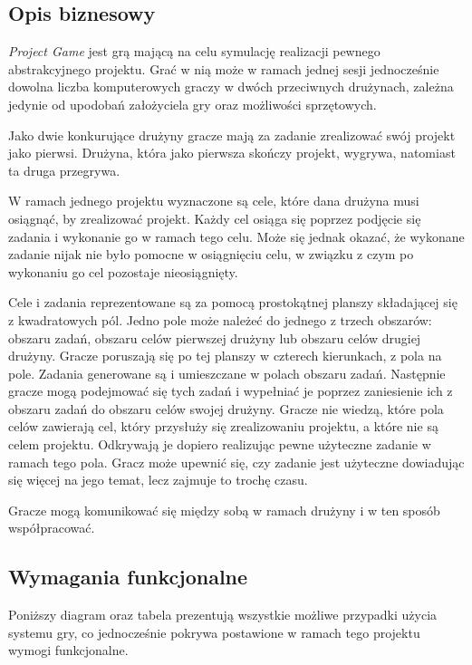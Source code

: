 \documentclass[11pt]{article}
\let\Oldsubsection\subsection
\renewcommand{\subsection}{\FloatBarrier\Oldsubsection}
\begin{document}
\subsection{Opis biznesowy}
\par
\textit{Project Game} jest grą mającą na celu symulację realizacji pewnego abstrakcyjnego projektu. Grać w nią może w ramach jednej sesji jednocześnie dowolna liczba komputerowych graczy w dwóch przeciwnych drużynach, zależna jedynie od upodobań założyciela gry oraz możliwości sprzętowych.
\par
Jako dwie konkurujące drużyny gracze mają za zadanie zrealizować swój projekt jako pierwsi. Drużyna, która jako pierwsza skończy projekt, wygrywa, natomiast ta druga przegrywa.
\par
W ramach jednego projektu wyznaczone są cele, które dana drużyna musi osiągnąć, by zrealizować projekt. Każdy cel osiąga się poprzez podjęcie się zadania i wykonanie go w ramach tego celu. Może się jednak okazać, że wykonane zadanie nijak nie było pomocne w osiągnięciu celu, w związku z czym po wykonaniu go cel pozostaje nieosiągnięty.
\par
Cele i zadania reprezentowane są za pomocą prostokątnej planszy składającej się z kwadratowych pól. Jedno pole może należeć do jednego z trzech obszarów: obszaru zadań, obszaru celów pierwszej drużyny lub obszaru celów drugiej drużyny. Gracze poruszają się po tej planszy w czterech kierunkach, z pola na pole. Zadania generowane są i umieszczane w polach obszaru zadań. Następnie gracze mogą podejmować się tych zadań i wypełniać je poprzez zaniesienie ich z obszaru zadań do obszaru celów swojej drużyny. Gracze nie wiedzą, które pola celów zawierają cel, który przysłuży się zrealizowaniu projektu, a które nie są celem projektu. Odkrywają je dopiero realizując pewne użyteczne zadanie w ramach tego pola. Gracz może upewnić się, czy zadanie jest użyteczne dowiadując się więcej na jego temat, lecz zajmuje to trochę czasu.
\par
Gracze mogą komunikować się między sobą w ramach drużyny i w ten sposób współpracować.

\subsection{Wymagania funkcjonalne}
\par
Poniższy diagram oraz tabela prezentują wszystkie możliwe przypadki użycia systemu gry, co jednocześnie pokrywa postawione w ramach tego projektu wymogi funkcjonalne.
\end{document}
